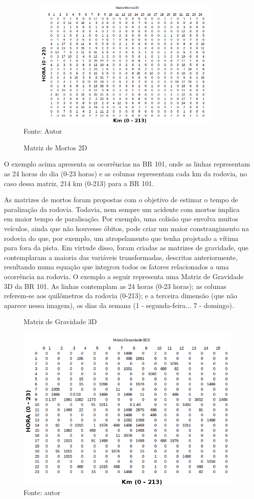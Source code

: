 \pagebreak

\begin{figure}[!ht]
\centering
\caption{Matriz de Mortos 2D}
\label{fig:MatrizMortos2D}
\includegraphics[width=110mm, height=65mm]{Figuras/Metodologia/MatrizMortos2D}\\
\tiny Fonte: Autor
\end{figure}

O exemplo acima apresenta as ocorrências na BR 101, onde as linhas representam as 24 horas do dia (0-23 horas) e as colunas representam cada km da rodovia, no caso dessa matriz, 214 km (0-213) para a BR 101. 



As matrizes de mortos foram propostas com o objetivo de estimar o tempo de paralização da rodovia. Todavia, nem sempre um acidente com mortos implica em maior tempo de paralisação. Por exemplo, uma colisão que envolva muitos veículos, ainda que não houvesse óbitos, pode criar um maior constrangimento na rodovia do que, por exemplo, um atropelamento que tenha projetado a vítima para fora da pista. Em virtude disso, foram criadas as matrizes de gravidade, que contemplaram a maioria das variáveis transformadas, descritas anteriormente, resultando numa equação que integrou todos os fatores relacionados a uma ocorrência na rodovia. O exemplo a seguir representa uma Matriz de Gravidade 3D da BR 101. As linhas contemplam as 24 horas (0-23 horas); as colunas referem-se aos quilômetros da rodovia (0-213); e a terceira dimensão (que não aparece nessa imagem), os dias da semana (1 - segunda-feira... 7 - domingo). 

\begin{figure}
\centering
\caption{Matriz de Gravidade 3D}
\caption{}
\label{fig:MatrizGravidade3D2}
\includegraphics[width=0.7\linewidth]{Figuras/Metodologia/MatrizGravidade3D2}\\
\tiny Fonte: autor
\end{figure}

